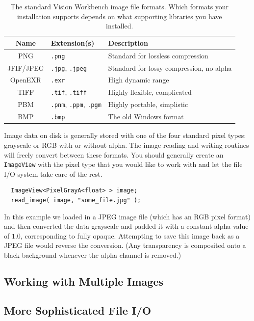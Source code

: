 \begin{table}[t]\begin{centering}
\begin{tabular}{|c|l|l|} \hline
Name & Extension(s) & Description \\ \hline \hline
PNG & \verb#.png# & Standard for lossless compression \\ \hline
JFIF/JPEG & \verb#.jpg#, \verb#.jpeg# & Standard for lossy compression, no alpha \\ \hline
OpenEXR & \verb#.exr# & High dynamic range \\ \hline
TIFF & \verb#.tif#, \verb#.tiff# & Highly flexible, complicated \\ \hline
PBM & \verb#.pnm#, \verb#.ppm#, \verb#.pgm# & Highly portable, simplistic \\ \hline
BMP & \verb#.bmp# & The old Windows format \\ \hline
\end{tabular}
\caption{The standard Vision Workbench image file formats.  Which formats 
your installation supports depends on what supporting libraries you have installed.}
\label{tbl:file-formats}
\end{centering}\end{table}

Image data on disk is generally stored with one of the four standard
pixel types: grayscale or RGB with or without alpha.  The image
reading and writing routines will freely convert between these
formats.  You should generally create an \verb#ImageView# with the
pixel type that you would like to work with and let the file I/O
system take care of the rest.
\begin{verbatim}
  ImageView<PixelGrayA<float> > image;
  read_image( image, "some_file.jpg" );
\end{verbatim}
In this example we loaded in a JPEG image file (which has an RGB pixel
format) and then converted the data grayscale and padded it with a
constant alpha value of $1.0$, corresponding to fully opaque.  
Attempting to save this image back as a JPEG file would reverse the 
conversion.  (Any transparency is composited onto a black background 
whenever the alpha channel is removed.)

\subsection{Working with Multiple Images}

\subsection{More Sophisticated File I/O}

